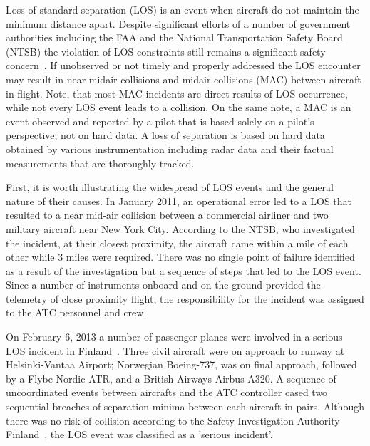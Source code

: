 \documentclass[letter,onecolumn,12pt]{aiaa-tc}
\newcommand{\1}{1_n}
\begin{document}
Loss of standard separation (LOS) is an event when aircraft do not maintain the minimum distance apart. Despite significant efforts of a number of government authorities including the FAA and the National Transportation Safety Board (NTSB) the violation of LOS constraints still remains a significant safety concern~\cite{OIG_AR2013}. If unobserved or not timely and properly addressed the LOS encounter may result in near midair collisions and midair collisions (MAC) between aircraft in flight. Note, that most MAC incidents are direct results of LOS occurrence, while not every LOS event leads to a collision. On the same note, a MAC is an event observed and reported by a pilot that is based solely on a pilot's perspective, not on hard data. A loss of separation is based on hard data obtained by various instrumentation including radar data and their factual measurements that are thoroughly tracked.

First, it is worth illustrating the widespread of LOS events and the general nature of their causes. In January 2011, an operational error led to a LOS that resulted to a near mid-air collision  between a commercial airliner and two military aircraft near New York City. According to the NTSB\cite{OIG_AR2013}, who investigated the incident, at their closest proximity, the aircraft came within a mile of each other while 3 miles were required. There was no single point of failure identified as a result of the investigation but a sequence of steps that led to the LOS event. Since a number of instruments onboard and on the ground provided the telemetry of close proximity flight, the responsibility for the incident was assigned to the ATC personnel and crew.

On February 6, 2013  a number of  passenger planes were involved in a serious LOS incident in Finland~\cite{Vantaa_IR2013}.  Three civil aircraft were on approach to runway at Helsinki-Vantaa Airport; Norwegian Boeing-737, was on final approach, followed by a Flybe Nordic ATR, and a British Airways Airbus A320. A sequence of uncoordinated events between aircrafts and the ATC controller cased two sequential breaches of separation minima between each aircraft in pairs. Although there was no risk of collision according to the Safety Investigation Authority Finland~\cite{Vantaa_IR2013}, the LOS event was classified as a 'serious incident'.
\end{document}
